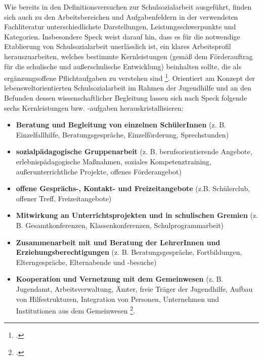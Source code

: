 Wie bereits in den Definitionsversuchen zur Schulsozialarbeit ausgeführt, finden sich auch zu den Arbeitsbereichen und Aufgabenfeldern in der verwendeten Fachliteratur unterschiedlichste Darstellungen, Leistungsschwerpunkte und Kategorien. Insbesondere Speck weist darauf hin, dass es für die notwendige Etablierung von Schulsozialarbeit unerlässlich ist, ein klares Arbeitsprofil herauszuarbeiten, welches bestimmte Kernleistungen (gemäß dem Förderauftrag für die schulische und außerschulische Entwicklung) beinhalten sollte, die als ergänzungsoffene Pflichtaufgaben zu verstehen sind \footcite[vgl.][62]{Speck2007}. Orientiert am Konzept der lebensweltorientierten Schulsozialarbeit im Rahmen der Jugendhilfe und an den Befunden dessen wissenschaftlicher Begleitung lassen sich nach Speck folgende sechs Kernleistungen bzw. -aufgaben herauskristallisieren: 
\begin{itemize}
	\item \textbf{Beratung und Begleitung von einzelnen SchülerInnen} (z. B. Einzelfallhilfe, Beratungsgespräche, Einzelförderung, Sprechstunden)
	\item \textbf{sozialpädagogische Gruppenarbeit} (z. B. berufsorientierende Angebote, erlebnispädagogische Maßnahmen, soziales Kompetenztraining, außerunterrichtliche Projekte, offenes Förderangebot)
	\item \textbf{offene Gesprächs-, Kontakt- und Freizeitangebote} (z.B. Schülerclub, offener Treff, Freizeitangebote)
	\item \textbf{Mitwirkung an Unterrichtsprojekten und in schulischen Gremien} (z. B. Gesamtkonferenzen, Klassenkonferenzen, Schulprogrammarbeit)
	\item \textbf{Zusammenarbeit mit und Beratung der LehrerInnen und Erziehungsberechtigungen} (z. B. Beratungsgespräche, Fortbildungen, Elterngespräche, Elternabende und -besuche)
	\item \textbf{Kooperation und Vernetzung mit dem Gemeinwesen} (z. B. Jugendamt, Arbeitsverwaltung, Ämter, freie Träger der Jugendhilfe, Aufbau von Hilfestrukturen, Integration von Personen, Unternehmen und Institutionen aus dem Gemeinwesen \footcite[vgl.][63f]{Speck2007}.
\end{itemize}

